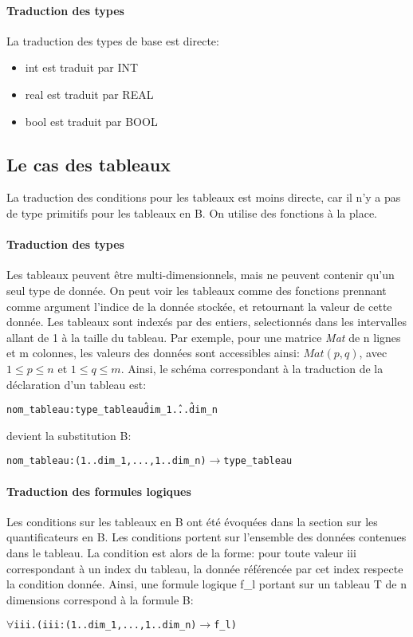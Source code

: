 \paragraph{Traduction des types}
La traduction des types de base est directe:
\begin{itemize}
\item int est traduit par INT
\item real est traduit par REAL
\item bool est traduit par BOOL
\end{itemize}

\subsection{Le cas des tableaux}
La traduction des conditions pour les tableaux est moins directe, car il n'y a
pas de type primitifs pour les tableaux en B. On utilise des fonctions à la
place. 

\paragraph{Traduction des types}
Les tableaux peuvent être multi-dimensionnels, mais ne peuvent contenir qu'un
seul type de donnée. On peut voir les tableaux comme des fonctions prennant
comme argument l'indice de la donnée stockée, et retournant la valeur de cette
donnée. Les tableaux sont indexés par des entiers, selectionnés dans les
intervalles allant de 1 à la taille du tableau.
Par exemple, pour une matrice \emph{Mat} de n lignes et m colonnes, les valeurs
des données sont accessibles ainsi: $Mat(p, q)$, avec $1 \leq p \leq n$ et $1 \leq q
\leq m$.
Ainsi, le schéma correspondant à la traduction de la déclaration d'un tableau
est:
\begin{alltt}
nom\_tableau : type\_tableau \^ dim_1 \^ ... \^ dim_n
\end{alltt}
devient la substitution B:
\begin{alltt}
nom\_tableau : (1..dim_1, ..., 1..dim_n) \(\rightarrow\) type\_tableau 
\end{alltt}

\paragraph{Traduction des formules logiques}
Les conditions sur les tableaux en B ont été évoquées dans la section sur les
quantificateurs en B. Les conditions portent sur l'ensemble des données
contenues dans le tableau. La condition est alors de la forme: pour toute valeur
iii correspondant à un index du tableau, la donnée référencée par cet index
respecte la condition donnée. Ainsi, une formule logique f\_l portant sur un
tableau T de n dimensions correspond à la formule B: 
\begin{alltt}
\(\forall \)iii. (iii : (1..dim_1, ..., 1..dim_n) \(\rightarrow\) f\_l)
\end{alltt}

